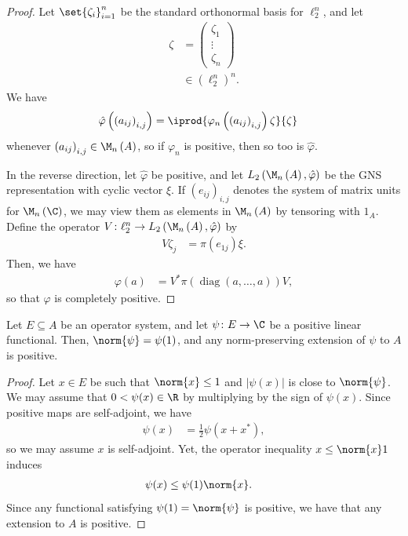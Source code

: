 \documentclass[10pt]{mypackage}
\begin{document}
\begin{proof}
  Let $\set{\zeta_i}_{i=1}^{n}$ be the standard orthonormal basis for $\ell_2^n$, and let
  \begin{align*}
    \zeta &= \begin{pmatrix}\zeta_1\\\vdots\\\zeta_n\end{pmatrix}\\
          &\in \left( \ell_2^n \right)^n.
  \end{align*}
  We have
  \begin{align*}
    \hat{\varphi}\left( \left( a_{ij} \right)_{i,j} \right) &= \iprod{\varphi_n\left( \left( a_{ij} \right)_{i,j} \right)\zeta}{\zeta}
  \end{align*}
  whenever $\left( a_{ij} \right)_{i,j}\in \M_n\left( A \right)$, so if $\varphi_n$ is positive, then so too is $\hat{\varphi}$.

  In the reverse direction, let $\hat{\varphi}$ be positive, and let $L_2\left( \M_n\left( A \right),\hat{\varphi} \right)$ be the GNS representation with cyclic vector $\xi$. If $\left( e_{ij} \right)_{i,j}$ denotes the system of matrix units for $\M_n\left( \C \right)$, we may view them as elements in $\M_n\left( A \right)$ by tensoring with $1_A$. Define the operator $V\colon \ell_2^n\rightarrow L_2\left( \M_n\left( A \right),\hat{\varphi} \right)$ by
  \begin{align*}
    V\zeta_j &= \pi\left( e_{1j} \right)\xi.
  \end{align*}
  Then, we have
  \begin{align*}
    \varphi(a) &= V^{\ast}\pi\left( \operatorname{diag}\left( a,\dots,a \right) \right)V,
  \end{align*}
  so that $\varphi$ is completely positive.
\end{proof}
\begin{lemma}
  Let $E\subseteq A$ be an operator system, and let $\psi\colon E\rightarrow \C$ be a positive linear functional. Then, $\norm{\psi} = \psi(1)$, and any norm-preserving extension of $\psi$ to $A$ is positive.
\end{lemma}
\begin{proof}
  Let $x\in E$ be such that $\norm{x}\leq 1$ and $\left\vert \psi(x) \right\vert$ is close to $\norm{\psi}$. We may assume that $0 < \psi(x)\in \R$ by multiplying by the sign of $\psi(x)$. Since positive maps are self-adjoint, we have
  \begin{align*}
    \psi(x) &= \frac{1}{2}\psi\left( x + x^{\ast} \right),
  \end{align*}
  so we may assume $x$ is self-adjoint. Yet, the operator inequality $x\leq \norm{x}1$ induces
  \begin{align*}
    \psi(x) &\leq \psi(1)\norm{x}.
  \end{align*}
  Since any functional satisfying $\psi(1) = \norm{\psi}$ is positive, we have that any extension to $A$ is positive.
\end{proof}
\end{document}
